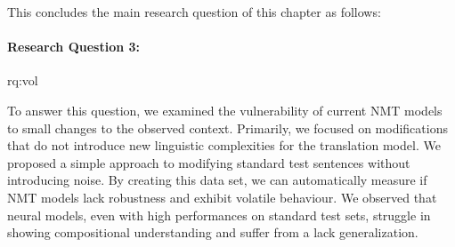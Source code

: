 \noindent 
This concludes the main research question of this chapter as follows:

\paragraph{Research Question 3:} \acl{rq:vol} 

\medskip

 \noindent  To answer this question, we examined the vulnerability of current NMT models to small changes to the observed context. 
Primarily, we focused on modifications that do {not} introduce new linguistic complexities for the translation model. 
We proposed a simple approach to modifying standard test sentences without introducing noise. 
By creating this data set, we can automatically measure if NMT models lack robustness and exhibit volatile behaviour. 
We observed that neural models, even with high performances on standard test sets, struggle in showing compositional understanding and suffer from a lack generalization.


